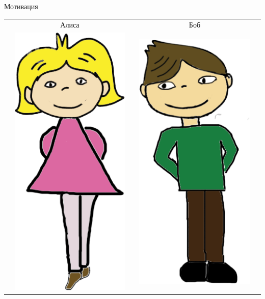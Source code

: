 \documentclass[usenames,dvipsnames,8pt,aspectratio=169]{beamer}
\begin{document}
\begin{frame}{Мотивация}
\Large
	\begin{center}
		\begin{tabular}{c c c c c}
			& Алиса  & & Боб &  \\
			& \multirow{5}{*}{\includegraphics[scale=0.15]{Alice}} & &
			\multirow{5}{*}{\includegraphics[scale=0.15]{Bob}} &  \\

\end{tabular}
\end{center}
\end{frame}
\end{document}
